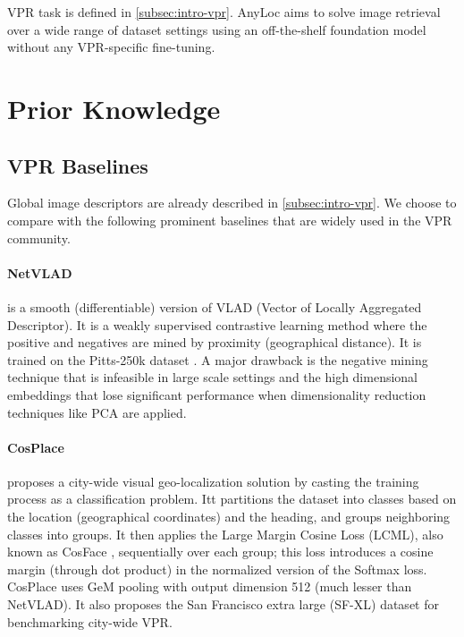 VPR task is defined in \cref{subsec:intro-vpr}. AnyLoc aims to solve
image retrieval over a wide range of dataset settings using an
off-the-shelf foundation model without any VPR-specific fine-tuning.

\section{Prior Knowledge}

\subsection{VPR Baselines}

Global image descriptors are already described in
\cref{subsec:intro-vpr}. We choose to compare with the following
prominent baselines that are widely used in the VPR community.

\paragraph{NetVLAD \cite{Arandjelovi2015NetVLADCA}} is a smooth
(differentiable) version of VLAD (Vector of Locally Aggregated
Descriptor). It is a weakly supervised contrastive learning method
where the positive and negatives are mined by proximity (geographical
distance). It is trained on the Pitts-250k dataset
\cite{Torii2013VisualPR}. A major drawback is the negative mining
technique that is infeasible in large scale settings and the high
dimensional embeddings that lose significant performance when
dimensionality reduction techniques like PCA are applied.

\paragraph{CosPlace \cite{Berton2022RethinkingVG}} proposes a
city-wide visual geo-localization solution by casting the training
process as a classification problem. Itt partitions the dataset into
classes based on the location (geographical coordinates) and the
heading, and groups neighboring classes into groups. It then applies
the Large Margin Cosine Loss (LCML), also known as CosFace
\cite{Wang2018CosFaceLM}, sequentially over each group; this loss
introduces a cosine margin (through dot product) in the normalized
version of the Softmax loss. CosPlace uses GeM pooling with output
dimension 512 (much lesser than NetVLAD). It also proposes the San
Francisco extra large (SF-XL) dataset for benchmarking city-wide VPR.


